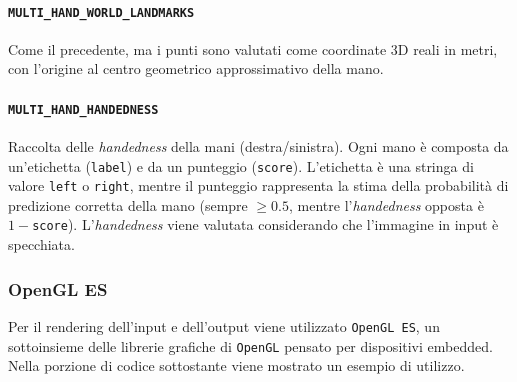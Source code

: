 \paragraph{\texttt{MULTI\_HAND\_WORLD\_LANDMARKS}} Come il precedente, ma i punti sono valutati come coordinate 3D reali in metri, con l'origine al centro geometrico approssimativo della mano.

\paragraph{\texttt{MULTI\_HAND\_HANDEDNESS}} Raccolta delle \textit{handedness} della mani (destra/sinistra). Ogni mano è composta da un'etichetta (\texttt{label}) e da un punteggio (\texttt{score}). L'etichetta è una stringa di valore \texttt{left} o \texttt{right}, mentre il punteggio rappresenta la stima della probabilità di predizione corretta della mano (sempre $\ge 0.5$, mentre l'\textit{handedness} opposta è $1-$\texttt{score}). L'\textit{handedness} viene valutata considerando che l'immagine in input è specchiata. 

\vspace{+10 px}

\subsubsection{OpenGL ES}
Per il rendering dell'input e dell'output viene utilizzato \texttt{OpenGL ES}, un sottoinsieme delle librerie grafiche di \texttt{OpenGL} pensato per dispositivi embedded.\\
Nella porzione di codice sottostante viene mostrato un esempio di utilizzo.


